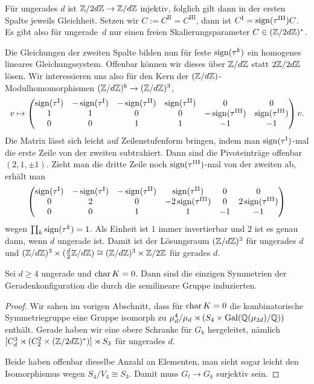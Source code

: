 Für ungerades $d$ ist $\Zmod 2dZ \to \Zmod dZ$ injektiv, folglich gilt dann in der ersten Spalte jeweils Gleichheit. Setzen wir $C := C^\mathrm{II} = C^\mathrm{III}$, dann ist $C^\mathrm{I} = \operatorname{sign}(\tau^\mathrm{III}) C$. Es gibt also für ungerade~$d$ nur einen freien Skalierungsparameter $C \in (\Zmod 2dZ)^*$.

Die Gleichungen der zweiten Spalte bilden nun für feste $\operatorname{sign}(\tau^k)$ ein homogenes lineares Gleichungssystem. Offenbar können wir dieses über $\Zmod dZ$ statt $2\Zmod 2dZ$ lösen. Wir interessieren uns also für den Kern der $(\Zmod dZ)$-Modulhomomorphismen $(\Zmod dZ)^6 \to (\Zmod dZ)^3$,
\begin{equation}
v \mapsto
\begin{pmatrix}
\operatorname{sign}(\tau^\mathrm{I}) & -\operatorname{sign}(\tau^\mathrm{I}) & -\operatorname{sign}(\tau^\mathrm{II}) & \operatorname{sign}(\tau^\mathrm{II}) & 0 & 0 \\
1 & 1 & 0 & 0 & -\operatorname{sign}(\tau^\mathrm{III}) & \operatorname{sign}(\tau^\mathrm{III}) \\
0 & 0 & 1 & 1 & -1 & -1
\end{pmatrix}v.
\end{equation}
Die Matrix lässt sich leicht auf Zeilenstufenform bringen, indem man $\operatorname{sign}(\tau^\mathrm{I})$-mal die erste Zeile von der zweiten subtrahiert. Dann sind die Pivoteinträge offenbar $(2,1,\pm 1)$. Zieht man die dritte Zeile noch $\operatorname{sign}(\tau^\mathrm{III})$-mal von der zweiten ab, erhält man
\begin{equation*}
\begin{pmatrix}
\operatorname{sign}(\tau^\mathrm{I}) & -\operatorname{sign}(\tau^\mathrm{I}) & -\operatorname{sign}(\tau^\mathrm{II}) & \operatorname{sign}(\tau^\mathrm{II}) & 0 & 0 \\
0 & 2 & 0 & -2\operatorname{sign}(\tau^\mathrm{III}) & 0 & 2\operatorname{sign}(\tau^\mathrm{III}) \\
0 & 0 & 1 & 1 & -1 & -1
\end{pmatrix}
\end{equation*}
wegen $\prod_k \operatorname{sign}(\tau^k) = 1$. Als Einheit ist $1$ immer invertierbar und $2$ ist es genau dann, wenn $d$ ungerade ist. Damit ist der Lösungsraum $(\Zmod dZ)^3$ für ungerades $d$ und $(\Zmod dZ)^3 \times (\frac d2\Zmod dZ) \cong (\Zmod dZ)^3 \times \Zmod 2Z$ für gerades $d$.

\begin{theorem}
Sei $d \geq 4$ ungerade und $\operatorname{char} K=0$. Dann sind die einzigen Symmetrien der Geradenkonfiguration die durch die semilineare Gruppe induzierten.
\end{theorem}
\begin{proof}
Wir sahen im vorigen Abschnitt, dass für $\operatorname{char} K=0$ die kombinatorische Symmetriegruppe eine Gruppe isomorph zu $\mu_d^4 / \mu_d \rtimes (S_4 \times \Gal \mathbb Q(\mu_{2d})/{\mathbb Q})$ enthält. Gerade haben wir eine obere Schranke für $G_k$ hergeleitet, nämlich $[C_d^3 \rtimes (C_2^2 \times (\Zmod 2dZ)^*)] \rtimes S_3$ für ungerades $d$.

Beide haben offenbar dieselbe Anzahl an Elementen, man sieht sogar leicht den Isomorphismus wegen $S_4/V_4 \cong S_3$. Damit muss $G_l \to G_k$ surjektiv sein.
\end{proof}

